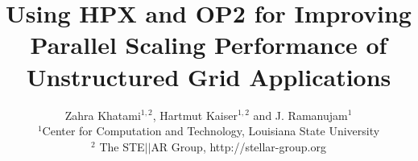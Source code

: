\documentclass[conference]{IEEEtran}
\begin{document}





%

\title{Using HPX and OP2 for Improving Parallel Scaling Performance of Unstructured Grid Applications}
\author{Zahra Khatami$^{1,2}$, Hartmut Kaiser$^{1,2}$ and J. Ramanujam$^{1}$ \\$^{1}$Center for Computation and Technology, Louisiana State University\\$^{2}$ The STE$||$AR Group, http://stellar-group.org
}
   
\maketitle
\end{document}
